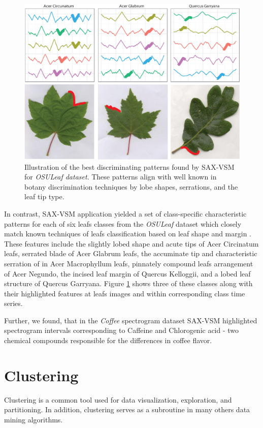 \documentclass{llncs}
\begin{document}
\begin{figure}[t]
   \centering
   \includegraphics[width=115mm]{figures/AcerCircunatum.eps}
   \caption{Illustration of the best discriminating patterns found by SAX-VSM for
\textit{OSULeaf dataset}. These patterns align with well known in botany discrimination techniques
by lobe shapes, serrations, and the leaf tip type.}
   \label{fig:shapelet-acer-patterns}
\end{figure}

In contrast, SAX-VSM application yielded a set of class-specific characteristic patterns for each of
six leafs classes from the \textit{OSULeaf} dataset which closely match known techniques of leafs
classification based on leaf shape and margin \cite{dirr}. These features include the slightly
lobed shape and acute tips of Acer Circinatum leafs, serrated blade of Acer Glabrum leafs,
the accuminate tip and characteristic serration of in Acer Macrophyllum leafs, pinnately compound
leafs arrangement of Acer Negundo, the incised leaf margin of Quercus Kelloggii, and a lobed leaf
structure of Quercus Garryana. Figure \ref{fig:shapelet-acer-patterns} shows three of these classes
along with their highlighted features at leafs images and within corresponding class time series.

Further, we found, that in the \textit{Coffee} spectrogram dataset SAX-VSM highlighted spectrogram
intervals corresponding to Caffeine and Chlorogenic acid - two chemical compounds responsible for
the differences in coffee flavor.

\section{Clustering}
Clustering is a common tool used for data visualization, exploration, and partitioning. 
In addition, clustering serves as a subroutine in many others data mining algorithms.
\end{document}
